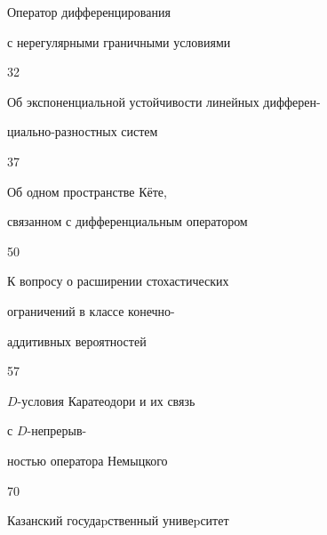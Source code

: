 

{Оператор дифференцирования 


с нерегулярными граничными условиями}{32}







{Об экспоненциальной устойчивости линейных дифферен-\newline


циально-разностных систем}{37}







{Об одном пространстве К\"ете, 


связанном с дифференциальным оператором}{50}







{К вопросу о расширении стохастических


ограничений в классе конечно-\newline


аддитивных вероятностей}{57}







{$D$-условия Каратеодори и их связь 


с $D$-непрерыв-\newline


ностью оператора Немыцкого}{70}




















\vfill


\noindent\raisebox{2pt}{\copyright} Казанский госудаpственный унивеpситет





